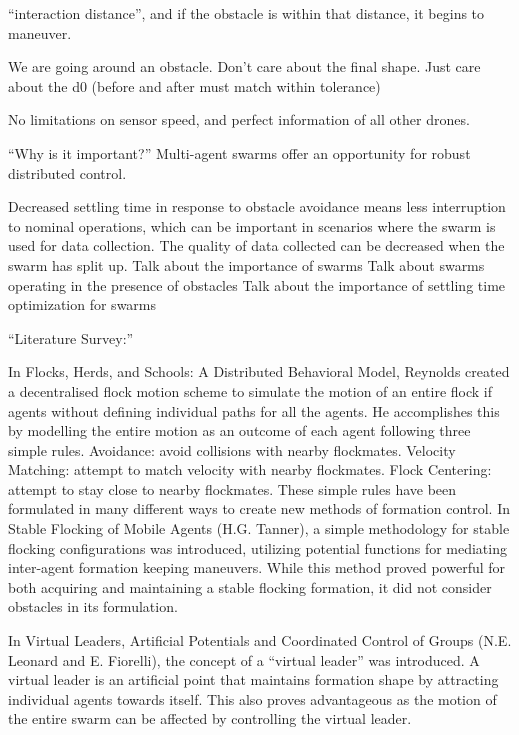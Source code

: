 \documentclass[11pt]{article}
\begin{document}
“interaction distance”, and if the obstacle is within that distance, it begins to maneuver.

We are going around an obstacle.  Don't care about the final shape.  Just care about the d0 (before and after must match within tolerance)

No limitations on sensor speed, and perfect information of all other drones.

“Why is it important?”
Multi-agent swarms offer an opportunity for robust distributed control.

Decreased settling time in response to obstacle avoidance means less interruption to nominal operations, which can be important in scenarios where the swarm is used for data collection.  The quality of data collected can be decreased when the swarm has split up.
Talk about the importance of swarms
Talk about swarms operating in the presence of obstacles
Talk about the importance of settling time optimization for swarms

“Literature Survey:”

In Flocks, Herds, and Schools: A Distributed Behavioral Model, Reynolds created a decentralised flock motion scheme to simulate the motion of an entire flock if agents without defining individual paths for all the agents. He accomplishes this by modelling the entire motion as an outcome of each agent following three simple rules. Avoidance: avoid collisions with nearby flockmates.  Velocity Matching: attempt to match velocity with nearby flockmates.  Flock Centering: attempt to stay close to nearby flockmates. These simple rules have been formulated in many different ways to create new methods of formation control.
In Stable Flocking of Mobile Agents (H.G. Tanner), a simple methodology for stable flocking configurations was introduced, utilizing potential functions for mediating inter-agent formation keeping maneuvers.  While this method proved powerful for both acquiring and maintaining a stable flocking formation, it did not consider obstacles in its formulation.

In Virtual Leaders, Artificial Potentials and Coordinated Control of Groups (N.E. Leonard and E. Fiorelli), the concept of a “virtual leader” was introduced. A virtual leader is an artificial point that maintains formation shape by attracting individual agents towards itself. This also proves advantageous as the motion of the entire swarm can be affected by controlling the virtual leader. 
\end{document}
